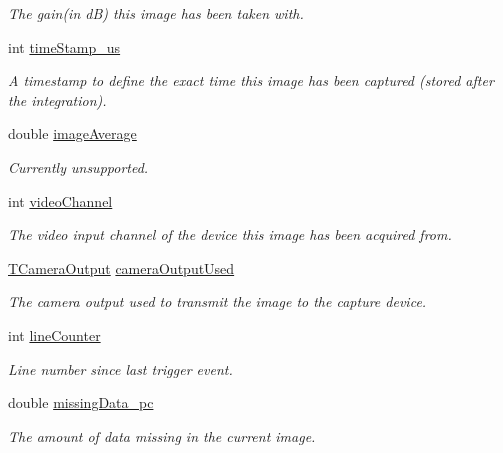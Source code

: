 \begin{DoxyCompactItemize}
\begin{DoxyCompactList}\small\item\em The gain(in d\+B) this image has been taken with. \end{DoxyCompactList}\item 
int \hyperlink{struct_request_info_a29fdb078f00559da9d860360b46d55de}{time\+Stamp\+\_\+us}
\begin{DoxyCompactList}\small\item\em A timestamp to define the exact time this image has been captured (stored after the integration). \end{DoxyCompactList}\item 
\hypertarget{struct_request_info_a7a134a73561651b8f5cc1f394e51acfa}{double \hyperlink{struct_request_info_a7a134a73561651b8f5cc1f394e51acfa}{image\+Average}}\label{struct_request_info_a7a134a73561651b8f5cc1f394e51acfa}

\begin{DoxyCompactList}\small\item\em Currently unsupported. \end{DoxyCompactList}\item 
int \hyperlink{struct_request_info_a47f673c91d2a9a31e5d38a6f33e297dd}{video\+Channel}
\begin{DoxyCompactList}\small\item\em The video input channel of the device this image has been acquired from. \end{DoxyCompactList}\item 
\hyperlink{group___common_interface_gad85678f02bc0deb0eee9f7ce67644da7}{T\+Camera\+Output} \hyperlink{struct_request_info_aa31d1557a0a099f3707a318acad4e3be}{camera\+Output\+Used}
\begin{DoxyCompactList}\small\item\em The camera output used to transmit the image to the capture device. \end{DoxyCompactList}\item 
int \hyperlink{struct_request_info_a6c4a78c83c828ba242edca74ccf11d8d}{line\+Counter}
\begin{DoxyCompactList}\small\item\em Line number since last trigger event. \end{DoxyCompactList}\item 
double \hyperlink{struct_request_info_a6a23732e1a2914028770a213efbfe6ce}{missing\+Data\+\_\+pc}
\begin{DoxyCompactList}\small\item\em The amount of data missing in the current image. \end{DoxyCompactList}\end{DoxyCompactItemize}


